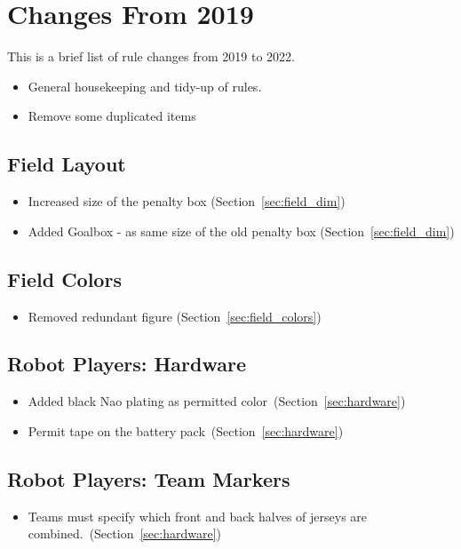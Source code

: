 \section{Changes From 2019}
This is a brief list of rule changes from 2019 to 2022.

\begin{itemize}
  \item General housekeeping and tidy-up of rules.
  \item Remove some duplicated items
\end{itemize}

\subsection*{Field Layout}
\begin{itemize}
  \item Increased size of the penalty box (\cf Section~\ref{sec:field_dim})
  \item Added Goalbox - as same size of the old penalty box (\cf Section~\ref{sec:field_dim})
\end{itemize}

\subsection*{Field Colors}
\begin{itemize}
  \item Removed redundant figure (\cf Section~\ref{sec:field_colors})
\end{itemize}

\subsection*{Robot Players: Hardware}
\begin{itemize}
  \item Added black Nao plating as permitted color~(\cf Section~\ref{sec:hardware})
  \item Permit tape on the battery pack~(\cf Section~\ref{sec:hardware})
\end{itemize}

\subsection*{Robot Players: Team Markers}
\begin{itemize}
  \item Teams must specify which front and back halves of jerseys are combined.~(\cf Section~\ref{sec:hardware})
\end{itemize}

